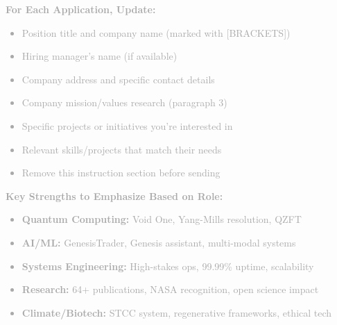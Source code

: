 \documentclass[11pt, letterpaper]{article}
\begin{document}
\textcolor{darkgray}{\small
\textbf{For Each Application, Update:}
\begin{itemize}[leftmargin=20pt, itemsep=2pt]
  \item Position title and company name (marked with [BRACKETS])
  \item Hiring manager's name (if available)
  \item Company address and specific contact details
  \item Company mission/values research (paragraph 3)
  \item Specific projects or initiatives you're interested in
  \item Relevant skills/projects that match their needs
  \item Remove this instruction section before sending
\end{itemize}

\textbf{Key Strengths to Emphasize Based on Role:}
\begin{itemize}[leftmargin=20pt, itemsep=2pt]
  \item \textbf{Quantum Computing:} Void One, Yang-Mills resolution, QZFT
  \item \textbf{AI/ML:} GenesisTrader, Genesis assistant, multi-modal systems
  \item \textbf{Systems Engineering:} High-stakes ops, 99.99\% uptime, scalability
  \item \textbf{Research:} 64+ publications, NASA recognition, open science impact
  \item \textbf{Climate/Biotech:} STCC system, regenerative frameworks, ethical tech
\end{itemize}
}
\end{document}
